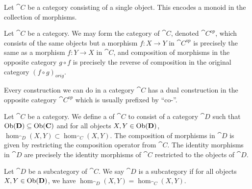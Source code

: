 \begin{node}[Category]
\begin{node}[Examples]
\begin{node}\label{cat-000M}%
Let $\cat{C}$ be a category consisting of a single object. This encodes
a monoid in the collection of morphisms.
\end{node}
\end{node} %

\begin{definition}\label{cat-000O}%
Let $\cat{C}$ be a category. We may form the  category
of $\cat{C}$, denoted $\cat{C}^{op}$, which consists of the same objects
but a morphism $f\colon X\to Y$ in $\cat{C}^{op}$ is precisely the same
as a morphism $f\colon Y\to X$ in $\cat{C}$, and composition of
morphisms in the opposite category $g\circ f$ is precisely the reverse
of composition in the original category $(f\circ g)_{orig}$.

\begin{node}\label{cat-000P}%
Every construction we can do in a category $\cat{C}$ has a dual
construction in the opposite category $\cat{C}^{op}$ which is usually
prefixed by ``co-''.
\end{node}
\end{definition}

\begin{definition}\label{cat-000G}%
Let $\cat{C}$ be a category. We define a  of $\cat{C}$
to consist of a category $\cat{D}$ such that $\operatorname{Ob}(\mathbf{D})\subseteq\operatorname{Ob}(\mathbf{C})$
and for all objects $X,Y\in\operatorname{Ob}(\mathbf{D})$,
$\hom_{\cat{D}}(X,Y)\subset\hom_{\cat{C}}(X,Y)$. The composition of
morphisms in $\cat{D}$ is given by restricting the composition operator
from $\cat{C}$. The identity morphisms in $\cat{D}$ are precisely the
identity morphisms of $\cat{C}$ restricted to the objects of $\cat{D}$.

\begin{definition}\label{cat-000H}%
Let $\cat{D}$ be a subcategory of $\cat{C}$. We say $\cat{D}$ is a
 subcategory if for all objects $X,Y\in\operatorname{Ob}(\mathbf{D})$, we
have $\hom_{\cat{D}}(X,Y)=\hom_{\cat{C}}(X,Y)$.
\end{definition}
\end{definition}
\end{node} %

